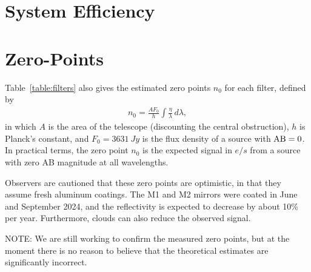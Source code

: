\section{System Efficiency}

\section{Zero-Points}

Table~\ref{table:filters} also gives the estimated zero points $n_0$ for each filter, defined by 
\begin{align}
n_0 = \frac{A F_0}{h}\int \frac{\eta}{\lambda}\,d\lambda,
\end{align}
in which $A$ is the area of the telescope (discounting the central obstruction), $h$ is Planck's constant, and $F_0 = 3631~\unit{Jy}$ is the flux density of a source with $\mbox{AB} = 0$. In practical terms, the zero point $n_0$ is the expected signal in $\unit{e/s}$ from a source with zero AB magnitude at all wavelengths.

Observers are cautioned that these zero points are optimistic, in that they assume fresh aluminum coatings. The M1 and M2 mirrors were coated in June and September 2024, and the reflectivity is expected to decrease by about 10\% per year. Furthermore, clouds can also reduce the observed signal.

NOTE: We are still working to confirm the measured zero points, but at the moment there is no reason to believe that the theoretical estimates are significantly incorrect.
